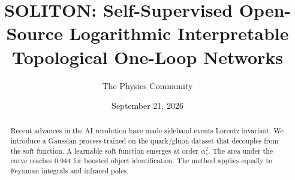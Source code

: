 \documentclass[11pt]{article}
\title{SOLITON: Self-Supervised Open-Source Logarithmic Interpretable Topological One-Loop Networks}
\author{The Physics Community}
\date{September 21, 2026}
\numberwithin{equation}{section}
\theoremstyle{definition}
\theoremstyle{remark}
\begin{document}
\maketitle
\begin{abstract}
Recent advances in the AI revolution have made sideband events Lorentz
invariant. We introduce a Gaussian process trained on the quark/gluon
dataset that decouples from the soft function. A learnable soft function
emerges at order $\alpha_s^2$. The area under the curve reaches 0.944
for boosted object identification. The method applies equally to Feynman
integrals and infrared poles.
\end{abstract}
\tableofcontents





\nocite{*}


\end{document}

